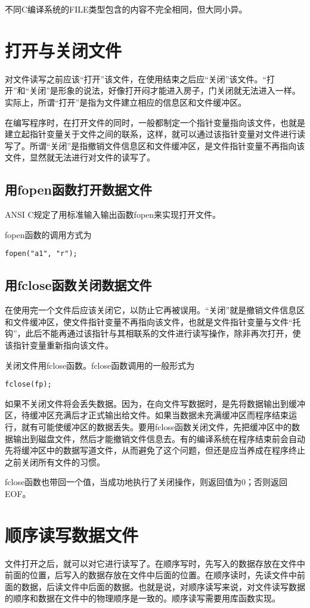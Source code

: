 不同C编译系统的FILE类型包含的内容不完全相同，但大同小异。
\section{打开与关闭文件}
对文件读写之前应该“打开”该文件，在使用结束之后应“关闭”该文件。“打开”和“关闭”是形象的说法，好像打开闷才能进入房子，门关闭就无法进入一样。实际上，所谓“打开”是指为文件建立相应的信息区和文件缓冲区。

在编写程序时，在打开文件的同时，一般都制定一个指针变量指向该文件，也就是建立起指针变量关于文件之间的联系，这样，就可以通过该指针变量对文件进行读写了。所谓“关闭”是指撤销文件信息区和文件缓冲区，是文件指针变量不再指向该文件，显然就无法进行对文件的读写了。
\subsection{用fopen函数打开数据文件}
ANSI C规定了用标准输入输出函数fopen来实现打开文件。

fopen函数的调用方式为
\begin{lstlisting}
fopen("a1", "r");
\end{lstlisting}
\subsection{用fclose函数关闭数据文件}
在使用完一个文件后应该关闭它，以防止它再被误用。“关闭”就是撤销文件信息区和文件缓冲区，使文件指针变量不再指向该文件，也就是文件指针变量与文件“托钩”，此后不能再通过该指针与其相联系的文件进行读写操作，除非再次打开，使该指针变量重新指向该文件。

关闭文件用fclose函数。fclose函数调用的一般形式为
\begin{lstlisting}
fclose(fp);
\end{lstlisting}

如果不关闭文件将会丢失数据。因为，在向文件写数据时，是先将数据输出到缓冲区，待缓冲区充满后才正式输出给文件。如果当数据未充满缓冲区而程序结束运行，就有可能使缓冲区的数据丢失。要用fclose函数关闭文件，先把缓冲区中的数据输出到磁盘文件，然后才能撤销文件信息去。有的编译系统在程序结束前会自动先将缓冲区中的数据写道文件，从而避免了这个问题，但还是应当养成在程序终止之前关闭所有文件的习惯。

fclose函数也带回一个值，当成功地执行了关闭操作，则返回值为0；否则返回EOF。
\section{顺序读写数据文件}
文件打开之后，就可以对它进行读写了。在顺序写时，先写入的数据存放在文件中前面的位置，后写入的数据存放在文件中后面的位置。在顺序读时，先读文件中前面的数据，后读文件中后面的数据。也就是说，对顺序读写来说，对文件读写数据的顺序和数据在文件中的物理顺序是一致的。顺序读写需要用库函数实现。
